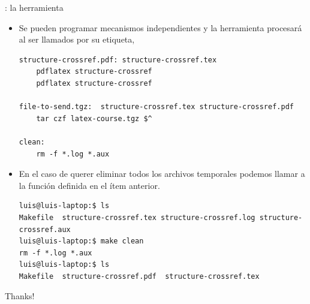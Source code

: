\documentclass[draft]{beamer}
\begin{document}
\begin{frame}[fragile]{\insertsection: la herramienta }
  \begin{itemize}
    \item Se pueden programar mecanismos independientes y la
      herramienta procesará al ser llamados por su etiqueta,
    \begin{center}
      \begin{verbatim}
structure-crossref.pdf: structure-crossref.tex
	pdflatex structure-crossref
	pdflatex structure-crossref

file-to-send.tgz:  structure-crossref.tex structure-crossref.pdf
	tar czf latex-course.tgz $^

clean:
	rm -f *.log *.aux 
      \end{verbatim}
    \end{center}
  \item En el caso de querer eliminar todos los archivos temporales
    podemos llamar a la función  definida en el ítem
    anterior.
    \begin{center}
      \begin{verbatim}
luis@luis-laptop:$ ls
Makefile  structure-crossref.tex structure-crossref.log structure-crossref.aux
luis@luis-laptop:$ make clean
rm -f *.log *.aux 
luis@luis-laptop:$ ls
Makefile  structure-crossref.pdf  structure-crossref.tex
      \end{verbatim}
    \end{center}
  \end{itemize}
\end{frame}


\begin{frame}
  \begin{center}
    Thanks!
  \end{center}
\end{frame}
\end{document}
